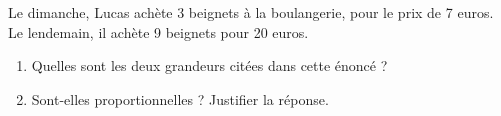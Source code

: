 \documentclass[exercice]{thedocument}%
\begin{document}
%
Le dimanche, Lucas achète 3 beignets à la boulangerie, pour le prix de 7 euros. Le
lendemain, il achète 9 beignets pour 20 euros.
\begin{enumerate}
    \item Quelles sont les deux grandeurs citées dans cette énoncé ?
    \item Sont-elles proportionnelles ? Justifier la réponse.
\end{enumerate}
\end{document}
